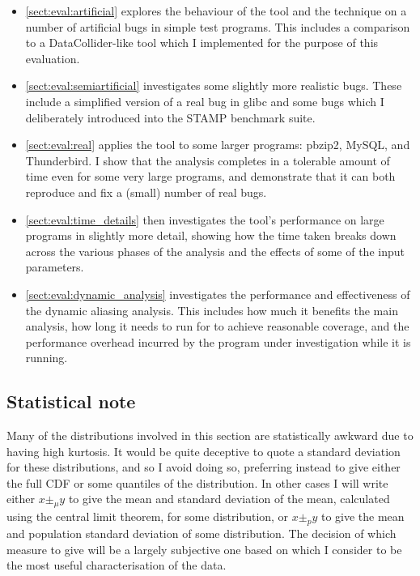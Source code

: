 \begin{itemize}
\item \autoref{sect:eval:artificial} explores the behaviour of the
  tool and the technique on a number of artificial bugs in simple test
  programs.  This includes a comparison to a
  DataCollider\needCite{}-like tool which I implemented for the
  purpose of this evaluation.
\item \autoref{sect:eval:semiartificial} investigates some
  slightly more realistic bugs.  These include a simplified version of
  a real bug in glibc\needCite{} and some bugs which I deliberately
  introduced into the STAMP benchmark suite\needCite{}.
\item \autoref{sect:eval:real} applies the tool to some larger
  programs: pbzip2\needCite{}, MySQL\needCite{}, and
  Thunderbird\needCite{}.  I show that the analysis completes in a
  tolerable amount of time even for some very large programs, and
  demonstrate that it can both reproduce and fix a (small) number of
  real bugs.
\item \autoref{sect:eval:time_details} then investigates the
  tool's performance on large programs in slightly more detail,
  showing how the time taken breaks down across the various phases of
  the analysis and the effects of some of the input parameters.
\item \autoref{sect:eval:dynamic_analysis} investigates the
  performance and effectiveness of the dynamic aliasing analysis.
  This includes how much it benefits the main analysis, how long it
  needs to run for to achieve reasonable coverage, and the performance
  overhead incurred by the program under investigation while it is
  running.
\end{itemize}

\subsection{Statistical note}

Many of the distributions involved in this section are statistically
awkward due to having high kurtosis.  It would be quite deceptive to
quote a standard deviation for these distributions, and so I avoid
doing so, preferring instead to give either the full CDF or some
quantiles of the distribution.  In other cases I will write either $x
\pm_\mu y$ to give the mean and standard deviation of the mean,
calculated using the central limit theorem, for some distribution, or
$x \pm_p y$ to give the mean and population standard deviation of some
distribution.  The decision of which measure to give will be a largely
subjective one based on which I consider to be the most useful
characterisation of the data.

